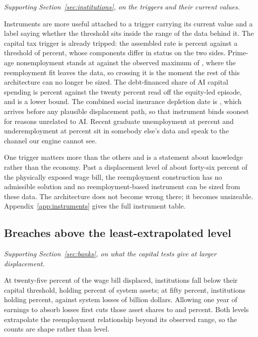\emph{Supporting Section~\ref{sec:institutions}, on the triggers and their current values.}

Instruments are more useful attached to a trigger carrying its current value and a label saying
whether the threshold sits inside the range of the data behind it. The capital tax trigger is already tripped:
the assembled rate is  percent against a threshold of 
percent, whose components differ in status on the two sides. Prime-age nonemployment stands at 
against the observed maximum of , where the reemployment fit leaves the data,
so crossing it is the moment the rest of this architecture can no longer be sized. The
debt-financed share of AI capital spending is  percent against the
twenty percent read off the equity-led episode, and is a lower bound. The combined social insurance
depletion date is , which arrives before any plausible displacement path,
so that instrument binds soonest for reasons unrelated to AI. Recent graduate unemployment at
 percent and underemployment at  percent sit
in somebody else's data and speak to the channel our engine cannot see.

One trigger matters more than the others and is a statement about knowledge rather than the
economy. Past a displacement level of about forty-six percent of the physically exposed wage bill,
the reemployment construction has no admissible solution and no reemployment-based instrument can
be sized from these data. The architecture does not become wrong there; it becomes unsizeable.
Appendix~\ref{app:instruments} gives the full instrument table.

\subsection{Breaches above the least-extrapolated level}

\emph{Supporting Section~\ref{sec:banks}, on what the capital tests give at larger displacement.}

At twenty-five percent of the wage bill displaced,  institutions fall
below their capital threshold, holding  percent of system assets;
at fifty percent,  institutions holding  percent,
against system losses of  billion dollars. Allowing one year of earnings to
absorb losses first cuts those asset shares to  and
 percent. Both levels extrapolate the reemployment relationship
beyond its observed range, so the counts are shape rather than level.

